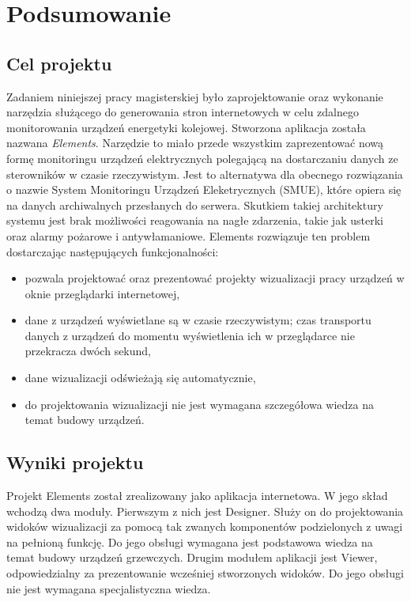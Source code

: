 \chapter{Podsumowanie}

\section{Cel projektu}
Zadaniem niniejszej pracy magisterskiej było zaprojektowanie oraz wykonanie narzędzia służącego do generowania stron internetowych w celu zdalnego monitorowania urządzeń energetyki kolejowej. Stworzona aplikacja została nazwana \textit{Elements}. Narzędzie to miało przede wszystkim zaprezentować nową formę monitoringu urządzeń elektrycznych polegającą na dostarczaniu danych ze sterowników w czasie rzeczywistym. Jest to alternatywa dla obecnego rozwiązania o nazwie System Monitoringu Urządzeń Eleketrycznych (SMUE), które opiera się na danych archiwalnych przesłanych do serwera. Skutkiem takiej architektury systemu jest brak możliwości reagowania na nagłe zdarzenia, takie jak usterki oraz alarmy pożarowe i antywłamaniowe. Elements rozwiązuje ten problem dostarczając następujących funkcjonalności:
\begin{itemize}
\item pozwala projektować oraz prezentować projekty wizualizacji pracy urządzeń w oknie przeglądarki internetowej,
\item dane z urządzeń wyświetlane są w czasie rzeczywistym; czas transportu danych z urządzeń do momentu wyświetlenia ich w przeglądarce nie przekracza dwóch sekund,
\item dane wizualizacji odświeżają się automatycznie,
\item do projektowania wizualizacji nie jest wymagana szczegółowa wiedza na temat budowy urządzeń.
\end{itemize}


\section{Wyniki projektu}
Projekt Elements został zrealizowany jako aplikacja internetowa. W jego skład wchodzą dwa moduły. Pierwszym z nich jest Designer. Służy on do projektowania widoków wizualizacji za pomocą tak zwanych komponentów podzielonych z uwagi na pełnioną funkcję. Do jego obsługi wymagana jest podstawowa wiedza na temat budowy urządzeń grzewczych. Drugim modułem aplikacji jest Viewer, odpowiedzialny za prezentowanie wcześniej stworzonych widoków. Do jego obsługi nie jest wymagana specjalistyczna wiedza.

